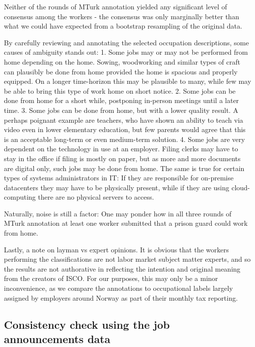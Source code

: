 \documentclass[11pt,]{article}
\begin{document}
Neither of the rounds of MTurk annotation yielded any significant level
of consensus among the workers - the consensus was only marginally
better than what we could have expected from a bootstrap resampling of
the original data.

By carefully reviewing and annotating the selected occupation
descriptions, some causes of ambiguity stands out: 1. Some jobs may or
may not be performed from home depending on the home. Sowing,
woodworking and similar types of craft can plausibly be done from home
provided the home is spacious and properly equipped. On a longer
time-horizon this may be plausible to many, while few may be able to
bring this type of work home on short notice. 2. Some jobs can be done
from home for a short while, postponing in-person meetings until a later
time. 3. Some jobs can be done from home, but with a lower quality
result. A perhaps poignant example are teachers, who have shown an
ability to teach via video even in lower elementary education, but few
parents would agree that this is an acceptable long-term or even
medium-term solution. 4. Some jobs are very dependent on the technology
in use at an employer. Filing clerks may have to stay in the office if
filing is mostly on paper, but as more and more documents are digital
only, such jobs may be done from home. The same is true for certain
types of systems administrators in IT: If they are responsible for
on-premise datacenters they may have to be physically present, while if
they are using cloud-computing there are no physical servers to access.

Naturally, noise is still a factor: One may ponder how in all three
rounds of MTurk annotation at least one worker submitted that a prison
guard could work from home.

Lastly, a note on layman vs expert opinions. It is obvious that the
workers performing the classifications are not labor market subject
matter experts, and so the results are not authorative in reflecting the
intention and original meaning from the creators of ISCO. For our
purposes, this may only be a minor inconvenience, as we compare the
annotations to occupational labels largely assigned by employers around
Norway as part of their monthly tax reporting.

\hypertarget{consistency-check-using-the-job-announcements-data}{%
\subsection{Consistency check using the job announcements
data}\label{consistency-check-using-the-job-announcements-data}}
\end{document}
